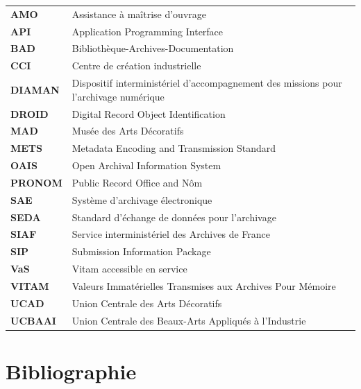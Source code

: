 \documentclass[12pt,twoside]{book}
\begin{document}
\begin{center}
	\renewcommand{\arraystretch}{1.3}
	\begin{tabular}{@{}ll@{}}
		\textbf{AMO}    & Assistance à maîtrise d’ouvrage \\
		\textbf{API}    & Application Programming Interface \\
		\textbf{BAD}    & Bibliothèque-Archives-Documentation \\
		\textbf{CCI}    & Centre de création industrielle \\
		\textbf{DIAMAN} & Dispositif interministériel d’accompagnement des missions pour l’archivage numérique \\
		\textbf{DROID}  & Digital Record Object Identification \\
		\textbf{MAD}    & Musée des Arts Décoratifs \\
		\textbf{METS}   & Metadata Encoding and Transmission Standard \\
		\textbf{OAIS}   & Open Archival Information System \\
		\textbf{PRONOM}   & Public Record Office and Nôm \\
		\textbf{SAE}    & Système d’archivage électronique \\
		\textbf{SEDA}   & Standard d’échange de données pour l’archivage \\
		\textbf{SIAF}   & Service interministériel des Archives de France \\
		\textbf{SIP}    & Submission Information Package \\
		\textbf{VaS}    & Vitam accessible en service \\
		\textbf{VITAM}  & Valeurs Immatérielles Transmises aux Archives Pour Mémoire \\
		\textbf{UCAD}   & Union Centrale des Arts Décoratifs \\
		\textbf{UCBAAI} & Union Centrale des Beaux-Arts Appliqués à l’Industrie
	\end{tabular}
\end{center}


	


\nocite{*}

\chapter{Bibliographie}
\end{document}
